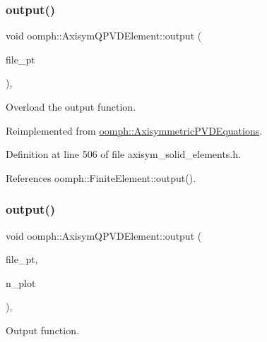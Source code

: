 \subsubsection{\texorpdfstring{output()}{output()}\hspace{0.1cm}{\footnotesize\ttfamily [3/4]}}
{\footnotesize\ttfamily void oomph\+::\+Axisym\+Q\+P\+V\+D\+Element\+::output (\begin{DoxyParamCaption}\item[{F\+I\+LE $\ast$}]{file\+\_\+pt }\end{DoxyParamCaption})\hspace{0.3cm}{\ttfamily [inline]}, {\ttfamily [virtual]}}



Overload the output function. 



Reimplemented from \hyperlink{classoomph_1_1AxisymmetricPVDEquations_a3b271e966cc554c21231503f7a965549}{oomph\+::\+Axisymmetric\+P\+V\+D\+Equations}.



Definition at line 506 of file axisym\+\_\+solid\+\_\+elements.\+h.



References oomph\+::\+Finite\+Element\+::output().

\mbox{\label{classoomph_1_1AxisymQPVDElement_afcd700bebcd0e1c83066da66804785c9}} 
\subsubsection{\texorpdfstring{output()}{output()}\hspace{0.1cm}{\footnotesize\ttfamily [4/4]}}
{\footnotesize\ttfamily void oomph\+::\+Axisym\+Q\+P\+V\+D\+Element\+::output (\begin{DoxyParamCaption}\item[{F\+I\+LE $\ast$}]{file\+\_\+pt,  }\item[{const unsigned \&}]{n\+\_\+plot }\end{DoxyParamCaption})\hspace{0.3cm}{\ttfamily [inline]}, {\ttfamily [virtual]}}



Output function. 



